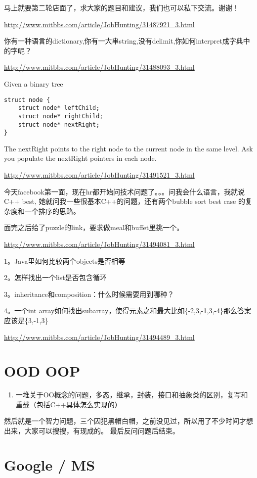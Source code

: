 \documentclass[12pt]{book}
\begin{document}
马上就要第二轮店面了，求大家的题目和建议，我们也可以私下交流。谢谢！

\url{http://www.mitbbs.com/article/JobHunting/31487921_3.html}

你有一种语言的dictionary,你有一大串string,没有delimit,你如何interpret成字典中的字呢？

\url{http://www.mitbbs.com/article/JobHunting/31488093_3.html}

Given a binary tree
\lstset{language=java,label= ,caption= ,numbers=none}
\begin{lstlisting}
struct node {
    struct node* leftChild;
    struct node* rightChild;
    struct node* nextRight;
}
\end{lstlisting}
The nextRight points to the right node to the current node in the same level. Ask you populate the nextRight pointers in each node.

\url{http://www.mitbbs.com/article/JobHunting/31491521_3.html}

今天facebook第一面，现在hr都开始问技术问题了。。。问我会什么语言，我就说C++ best, 她就问我一些很基本C++的问题，还有两个bubble sort best case 的复杂度和一个排序的思路。 

面完之后给了puzzle的link，要求做meal和buffet里挑一个。 

\url{http://www.mitbbs.com/article/JobHunting/31494081_3.html}

1。Java里如何比较两个objects是否相等

2。怎样找出一个list是否包含循环 

3。inheritance和composition：什么时候需要用到哪种？

4。一个int array如何找出subarray，使得元素之和最大比如\{-2,3,-1,3,-4\}那么答案应该是\{3,-1,3\}

\url{http://www.mitbbs.com/article/JobHunting/31494489_3.html}

\chapter{OOD OOP}
\label{sec-13}
\begin{enumerate}
\item 一堆关于OO概念的问题，多态，继承，封装，接口和抽象类的区别，复写和重载（包括C++具体怎么实现的）
\end{enumerate}

然后就是一个智力问题，三个囚犯黑帽白帽，之前没见过，所以用了不少时间才想出来，大家可以搜搜，有现成的。 最后反问问题后结束。

\chapter{Google / MS}
\label{sec-14}
\end{document}

